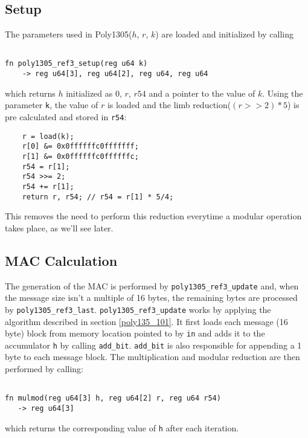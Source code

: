 \documentclass[twocolumn]{article}
\begin{document}
\subsection{Setup}
The parameters used in Poly1305($h$, $r$, $k$) are loaded and initialized by calling 

\begin{Verbatim}[fontsize=\footnotesize]

fn poly1305_ref3_setup(reg u64 k) 
    -> reg u64[3], reg u64[2], reg u64, reg u64

\end{Verbatim}

which returns $h$ initialized as 0, $r$, $r54$ and a pointer to the value of $k$.
Using the parameter \texttt{k}, the value of $r$ is loaded and the limb reduction($(r>>2)*5$) is pre calculated and stored in \texttt{r54}:
\begin{verbatim}
    r = load(k);
    r[0] &= 0x0ffffffc0fffffff;
    r[1] &= 0x0ffffffc0ffffffc;
    r54 = r[1];
    r54 >>= 2;
    r54 += r[1];
    return r, r54; // r54 = r[1] * 5/4;
\end{verbatim}
This removes the need to perform this reduction everytime a modular operation takes place, as we'll see later.

\subsection{MAC Calculation}
The generation of the MAC is performed by \texttt{poly1305\_ref3\_update} and, when the message size isn't a multiple of 16 bytes, the remaining bytes are processed by
\texttt{poly1305\_ref3\_last}.
\newline
\texttt{poly1305\_ref3\_update} works by applying the algorithm described in section \ref{poly135_101}. It first loads each message (16 byte) block from memory location
pointed to by \texttt{in} and adds it to the accumulator \texttt{h} by calling \texttt{add\_bit}. \texttt{add\_bit} is also responsible for appending a 1 byte
to each message block. The multiplication and modular reduction are then performed by calling:

\begin{Verbatim}[fontsize=\footnotesize]

fn mulmod(reg u64[3] h, reg u64[2] r, reg u64 r54) 
   -> reg u64[3]

\end{Verbatim}

which returns the corresponding value of \texttt{h} after each iteration.
\end{document}
